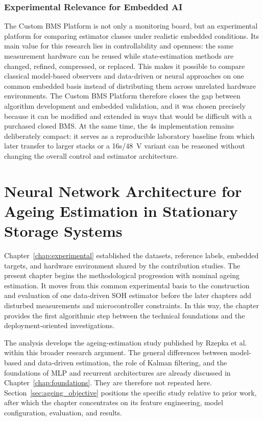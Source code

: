 \documentclass[
    a4paper,
    12pt,
    titlepage,
    bibliography=totoc,
    twoside=on,
    parskip=false,
    numbers=noenddot,
    cleardoublepage=empty,
    DIV=12,
    BCOR=12.0mm,
    headheight=36pt,
    headings=openright
]{scrreprt}
\begin{document}
\subsection{Experimental Relevance for Embedded AI}
The Custom BMS Platform is not only a monitoring board, but an experimental platform for comparing estimator classes under realistic embedded conditions. Its main value for this research lies in controllability and openness: the same measurement hardware can be reused while state-estimation methods are changed, refined, compressed, or replaced. This makes it possible to compare classical model-based observers and data-driven or neural approaches on one common embedded basis instead of distributing them across unrelated hardware environments. The Custom BMS Platform therefore closes the gap between algorithm development and embedded validation, and it was chosen precisely because it can be modified and extended in ways that would be difficult with a purchased closed BMS. At the same time, the 4s implementation remains deliberately compact: it serves as a reproducible laboratory baseline from which later transfer to larger stacks or a 16s/\SI{48}{\volt} variant can be reasoned without changing the overall control and estimator architecture.

\chapter{Neural Network Architecture for Ageing Estimation in Stationary Storage Systems}
\label{chap:ageing}
Chapter~\ref{chap:experimental} established the datasets, reference labels, embedded targets, and hardware environment shared by the contribution studies. The present chapter begins the methodological progression with nominal ageing estimation. It moves from this common experimental basis to the construction and evaluation of one data-driven SOH estimator before the later chapters add disturbed measurements and microcontroller constraints. In this way, the chapter provides the first algorithmic step between the technical foundations and the deployment-oriented investigations.

The analysis develops the ageing-estimation study published by Rzepka et al. within this broader research argument.\autocite{rzepkaNeuralNetworkArchitecture2023a} The general differences between model-based and data-driven estimation, the role of Kalman filtering, and the foundations of MLP and recurrent architectures are already discussed in Chapter~\ref{chap:foundations}. They are therefore not repeated here. Section~\ref{sec:ageing_objective} positions the specific study relative to prior work, after which the chapter concentrates on its feature engineering, model configuration, evaluation, and results.
\end{document}
